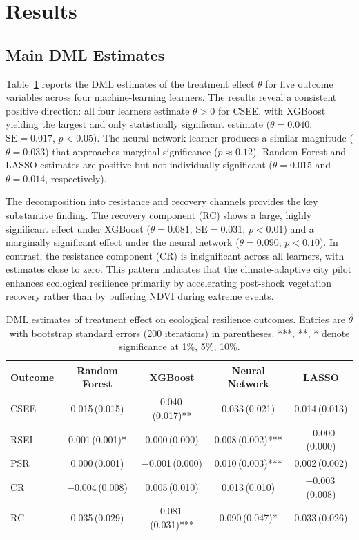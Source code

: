 \section{Results}
\label{sec:results}

\subsection{Main DML Estimates}

Table~\ref{tab:main_effects} reports the DML estimates of the
treatment effect $\theta$ for five outcome variables across four
machine-learning learners. The results reveal a consistent positive
direction: all four learners estimate $\theta > 0$ for CSEE, with
XGBoost yielding the largest and only statistically significant
estimate ($\theta = 0.040$, $\mathrm{SE} = 0.017$, $p < 0.05$). The
neural-network learner produces a similar magnitude ($\theta = 0.033$)
that approaches marginal significance ($p \approx 0.12$). Random
Forest and LASSO estimates are positive but not individually
significant ($\theta = 0.015$ and $\theta = 0.014$, respectively).

The decomposition into resistance and recovery channels provides the
key substantive finding. The recovery component (RC) shows a large,
highly significant effect under XGBoost ($\theta = 0.081$,
$\mathrm{SE} = 0.031$, $p < 0.01$) and a marginally significant effect
under the neural network ($\theta = 0.090$, $p < 0.10$). In contrast,
the resistance component (CR) is insignificant across all learners,
with estimates close to zero. This pattern indicates that the
climate-adaptive city pilot enhances ecological resilience primarily by
accelerating post-shock vegetation recovery rather than by buffering
NDVI during extreme events.

\begin{table}[htbp]
\centering
\caption{DML estimates of treatment effect on ecological resilience
outcomes. Entries are $\hat{\theta}$ with bootstrap standard errors
(200 iterations) in parentheses. ***, **, * denote significance at
1\%, 5\%, 10\%.}
\label{tab:main_effects}
\small
\begin{tabular}{lcccc}
\toprule
Outcome & Random Forest & XGBoost & Neural Network & LASSO \\
\midrule
CSEE  & 0.015\,(0.015) & 0.040\,(0.017)** & 0.033\,(0.021) & 0.014\,(0.013) \\
RSEI  & 0.001\,(0.001)* & 0.000\,(0.000)   & 0.008\,(0.002)*** & $-$0.000\,(0.000) \\
PSR   & 0.000\,(0.001)  & $-$0.001\,(0.000) & 0.010\,(0.003)*** & 0.002\,(0.002) \\
CR    & $-$0.004\,(0.008) & 0.005\,(0.010) & 0.013\,(0.010) & $-$0.003\,(0.008) \\
RC    & 0.035\,(0.029) & 0.081\,(0.031)*** & 0.090\,(0.047)* & 0.033\,(0.026) \\
\bottomrule
\end{tabular}
\end{table}

